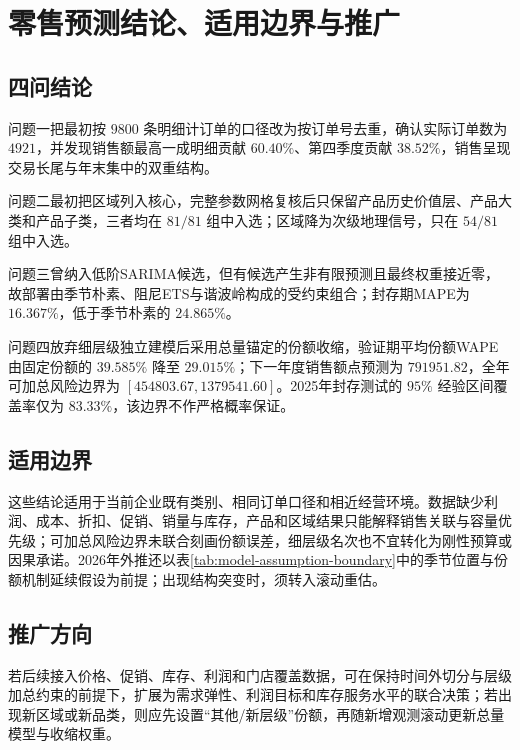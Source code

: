 \section{零售预测结论、适用边界与推广}

\subsection{四问结论}

问题一把最初按 $9800$ 条明细计订单的口径改为按订单号去重，确认实际订单数为 $4921$，并发现销售额最高一成明细贡献 $60.40\%$、第四季度贡献 $38.52\%$，销售呈现交易长尾与年末集中的双重结构。%

问题二最初把区域列入核心，完整参数网格复核后只保留产品历史价值层、产品大类和产品子类，三者均在 $81/81$ 组中入选；区域降为次级地理信号，只在 $54/81$ 组中入选。%

问题三曾纳入低阶SARIMA候选，但有候选产生非有限预测且最终权重接近零，故部署由季节朴素、阻尼ETS与谐波岭构成的受约束组合；封存期MAPE为 $16.367\%$，低于季节朴素的 $24.865\%$。%

问题四放弃细层级独立建模后采用总量锚定的份额收缩，验证期平均份额WAPE由固定份额的 $39.585\%$ 降至 $29.015\%$；下一年度销售额点预测为 $791951.82$，全年可加总风险边界为 $[454803.67,1379541.60]$。2025年封存测试的 $95\%$ 经验区间覆盖率仅为 $83.33\%$，该边界不作严格概率保证。%

\subsection{适用边界}

这些结论适用于当前企业既有类别、相同订单口径和相近经营环境。数据缺少利润、成本、折扣、促销、销量与库存，产品和区域结果只能解释销售关联与容量优先级；可加总风险边界未联合刻画份额误差，细层级名次也不宜转化为刚性预算或因果承诺。2026年外推还以表\ref{tab:model-assumption-boundary}中的季节位置与份额机制延续假设为前提；出现结构突变时，须转入滚动重估。%

\subsection{推广方向}

若后续接入价格、促销、库存、利润和门店覆盖数据，可在保持时间外切分与层级加总约束的前提下，扩展为需求弹性、利润目标和库存服务水平的联合决策；若出现新区域或新品类，则应先设置“其他/新层级”份额，再随新增观测滚动更新总量模型与收缩权重。%
